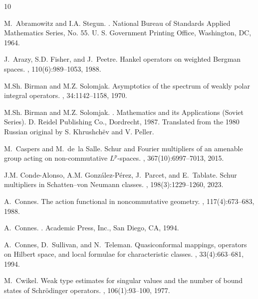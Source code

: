 \documentclass[12pt]{amsart}
\begin{document}
\begin{thebibliography}{10}

M.~Abramowitz and I.A. Stegun.
.
\newblock National Bureau of Standards Applied Mathematics Series, No. 55. U.
  S. Government Printing Office, Washington, DC, 1964.

J.~Arazy, S.D. Fisher, and J.~Peetre.
\newblock Hankel operators on weighted {B}ergman spaces.
, 110(6):989--1053, 1988.

M.Sh. Birman and M.Z. Solomjak.
\newblock Asymptotics of the spectrum of weakly polar integral operators.
, 34:1142--1158, 1970.

M.Sh. Birman and M.Z. Solomjak.
.
\newblock Mathematics and its Applications (Soviet Series). D. Reidel
  Publishing Co., Dordrecht, 1987.
\newblock Translated from the 1980 Russian original by S. Khrushch\"{e}v and V.
  Peller.

M.~Caspers and M.~de~la Salle.
\newblock Schur and {F}ourier multipliers of an amenable group acting on
  non-commutative {$L^p$}-spaces.
, 367(10):6997--7013, 2015.

J.M. Conde-Alonso, A.M. Gonz\'{a}lez-P\'{e}rez, J.~Parcet, and E.~Tablate.
\newblock Schur multipliers in {S}chatten--von {N}eumann classes.
, 198(3):1229--1260, 2023.

A.~Connes.
\newblock The action functional in noncommutative geometry.
, 117(4):673--683, 1988.

A.~Connes.
.
\newblock Academic Press, Inc., San Diego, CA, 1994.

A.~Connes, D.~Sullivan, and N.~Teleman.
\newblock Quasiconformal mappings, operators on {H}ilbert space, and local
  formulae for characteristic classes.
, 33(4):663--681, 1994.

M.~Cwikel.
\newblock Weak type estimates for singular values and the number of bound
  states of {S}chr\"{o}dinger operators.
, 106(1):93--100, 1977.


\end{thebibliography}
\end{document}
